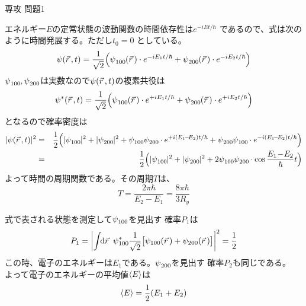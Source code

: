 \documentclass[fleqn]{jbook}
\begin{document}
\begin{answer}{専攻 問題1}{}
\begin{subanswers}
\SubAnswer
  \begin{subsubanswers}
  \SubSubAnswer
    エネルギー$E$の定常状態の波動関数の時間依存性は$e^{-iEt/\hbar}$
    であるので、式は次のように時間発展する。ただし$t_0=0$
    としている。
%
    \[ \psi(\vr,t)%
       = \frac{1}{\sqrt{2}}\Bigl(%
           \WF{100}(\vr)\cdot e^{-iE_1t/\hbar}%
          +\WF{200}(\vr)\cdot e^{-iE_2t/\hbar}%
         \Bigr) \]
%
    $\WF{100},\WF{200}$は実数なので$\psi(\vec{r}\,,t)$の複素共役は
%
    \[ \psi^\ast(\vr,t)%
       = \frac{1}{\sqrt{2}}\Bigl(%
           \WF{100}(\vr)\cdot e^{+iE_1t/\hbar}%
          +\WF{200}(\vr)\cdot e^{+iE_2t/\hbar}%
         \Bigr) \]
%
    となるので確率密度は
%
    \begin{eqnarray*}
      |\psi(\vr,t)|^2%
      &=& \frac{1}{2}\Bigl(%
            |\WF{100}|^2 + |\WF{200}|^2%
            + \WF{100}\WF{200}\cdot e^{+i(E_1\!-\!E_2)t/\hbar}%
            + \WF{200}\WF{100}\cdot e^{-i(E_1\!-\!E_2)t/\hbar}%
          \Bigr) \\
      &=& \frac{1}{2}\Bigl(%
            |\WF{100}|^2 + |\WF{200}|^2
            +2\WF{100}\WF{200}\cdot\cos{\frac{E_1\!-\!E_2}{\hbar}t}
          \Bigr) \\
    \end{eqnarray*}
%
    よって時間の周期関数である。その周期$T$は、
%
    \[ T = \frac{2\pi\hbar}{E_2-E_1} = \frac{8\pi\hbar}{3R_y} \]

  \SubSubAnswer
    式で表される状態を測定して$\WF{100}$を見出す
    確率$P_1$は
%
    \[ P_1 = \left| \Uint{\d{\vr}}\WFHC{100}%
             \frac{1}{\sqrt{2}}\bigl[%
               \psi_{100}(\vr) + \psi_{200}(\vr)%
             \bigr]%
             \right|^2 = \frac{1}{2} \]
%
    この時、電子のエネルギーは$E_1$である。$\WF{200}$を見出す
    確率$P_2$も同じである。\\
%
    よって電子のエネルギーの平均値$\langle{E}\rangle$は
%
    \[ \langle{E}\rangle = \frac{1}{2}(E_1+E_2) \]



\end{subsubanswers}
\end{subanswers}
\end{answer}
\end{document}
